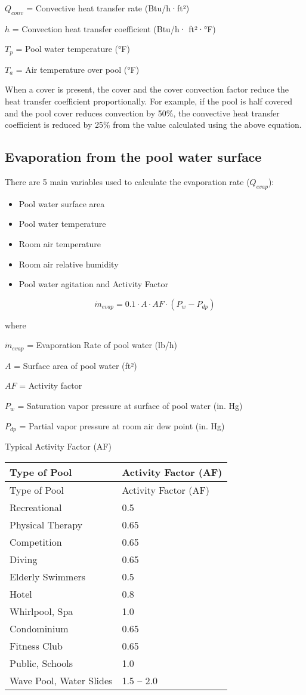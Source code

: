 \(Q_{conv}\) = Convective heat transfer rate (Btu/h·ft²)

\(h\) = Convection heat transfer coefficient (Btu/h· ft²·°F)

\(T_p\) = Pool water temperature (°F)

\(T_a\) = Air temperature over pool (°F)

When a cover is present, the cover and the cover convection factor reduce the heat transfer coefficient proportionally. For example, if the pool is half covered and the pool cover reduces convection by 50\%, the convective heat transfer coefficient is reduced by 25\% from the value calculated using the above equation.

\subsection{Evaporation from the pool water surface}\label{evaporation-from-the-pool-water-surface}

There are 5 main variables used to calculate the evaporation rate (\(Q_{evap}\)):

\begin{itemize}
\tightlist
\item
  Pool water surface area
\item
  Pool water temperature
\item
  Room air temperature
\item
  Room air relative humidity
\item
  Pool water agitation and Activity Factor
\end{itemize}

\begin{equation}
\dot{m}_{evap} = 0.1 \cdot A \cdot AF \cdot (P_w - P_{dp})
\end{equation}

where

\(\dot{m}_{evap}\) = Evaporation Rate of pool water (lb/h)

\(A\) = Surface area of pool water (ft²)

\(AF\) = Activity factor

\(P_w\) = Saturation vapor pressure at surface of pool water (in. Hg)

\(P_{dp}\) = Partial vapor pressure at room air dew point (in. Hg)

Typical Activity Factor (AF)

\begin{longtable}[c]{@{}ll@{}}
\toprule 
Type of Pool & Activity Factor (AF) \tabularnewline
\midrule
\endfirsthead

\toprule 
Type of Pool & Activity Factor (AF) \tabularnewline
\midrule
\endhead

Recreational & 0.5 \tabularnewline
Physical Therapy & 0.65 \tabularnewline
Competition & 0.65 \tabularnewline
Diving & 0.65 \tabularnewline
Elderly Swimmers & 0.5 \tabularnewline
Hotel & 0.8 \tabularnewline
Whirlpool, Spa & 1.0 \tabularnewline
Condominium & 0.65 \tabularnewline
Fitness Club & 0.65 \tabularnewline
Public, Schools & 1.0 \tabularnewline
Wave Pool, Water Slides & 1.5 – 2.0 \tabularnewline
\bottomrule
\end{longtable}

